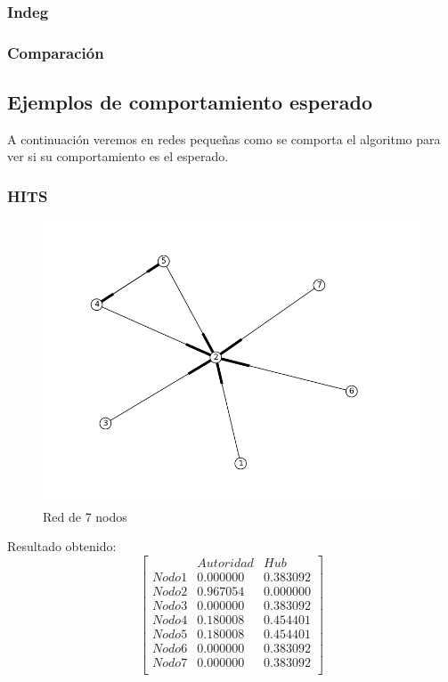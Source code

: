 \subsubsection{Indeg}

\subsubsection{Comparación}






\subsection{Ejemplos de comportamiento esperado}

A continuación veremos en redes pequeñas como se comporta el algoritmo para ver si su comportamiento es el esperado.

\subsubsection{HITS}
 \begin{figure}[!htb]
\begin{center}
    \includegraphics[scale=0.5]{imagenes/test4.png}
    \caption{Red de 7 nodos}
    \end{center}
\end{figure}

Resultado obtenido:
   $$ 
\begin{bmatrix}
              &    Autoridad  &  Hub \\
 Nodo 1 &   0.000000    &      0.383092       \\
 Nodo 2   &  0.967054    &  0.000000     \\
 Nodo 3   &  0.000000   &     0.383092  \\
 Nodo 4   &  0.180008    &     0.454401       \\
 Nodo 5   &  0.180008    &     0.454401        \\
 Nodo 6   &  0.000000    &      0.383092     \\
 Nodo 7   &  0.000000   &     0.383092 \\
\end{bmatrix} 
$$

